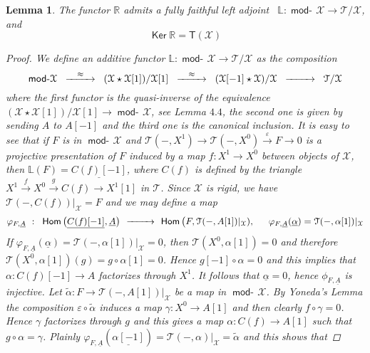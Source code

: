 \documentclass[oneside, a4paper,reqno]{amsart}
\numberwithin{equation}{section}
\newtheorem{lem}[thm]{Lemma}
\theoremstyle{definition}
\begin{document}
\begin{lem} The functor $\mathbb R$ admits a fully faithful left adjoint  \ $\mathbb L \colon \operatorname*{\mathsf{mod}-\!}{\mathcal X} {\longrightarrow} {\mathcal T}/{\mathcal X}$,  and \[\operatorname*{\mathsf{Ker}}\mathbb R = \mathsf{T}({\mathcal X})\]
\begin{proof} We define an additive functor $\mathbb{L} \colon \operatorname*{\mathsf{mod}-\!}{\mathcal X} {\longrightarrow} {\mathcal T}/{\mathcal X}$ as the composition
\[
\begin{CD}
\operatorname*{\mathsf{mod}-\!}{\mathcal X}  \ @> \approx >>  \  ({\mathcal X}\star{\mathcal X}[1])/{\mathcal X}[1] \  @> \approx >> \ ({\mathcal X}[-1]\star{\mathcal X})/{\mathcal X} \ @> >>  \ {\mathcal T}/{\mathcal X}
\end{CD}
\]   
where the first functor is the quasi-inverse of the equivalence $({\mathcal X}\star{\mathcal X}[1])/{\mathcal X}[1] {\longrightarrow} \operatorname*{\mathsf{mod}-\!}{\mathcal X}$, see Lemma $4.4$, the second one is given by sending $A$ to $A[-1]$ and the third one is the canonical inclusion. It is easy to see that if $F$ is in $\operatorname*{\mathsf{mod}-\!}{\mathcal X}$ and ${\mathcal T}(-,X^{1}) {\longrightarrow} {\mathcal T}(-,X^{0}) \stackrel{\varepsilon}{\longrightarrow} F {\longrightarrow} 0$ is a projective presentation of $F$ induced by a map $f \colon X^{1} {\longrightarrow} X^{0}$ between objects of ${\mathcal X}$, then $\mathbb{L}(F) = \underline{C(f)[-1]}$, where $C(f)$ is defined by the triangle $X^{1} \stackrel{f}{\longrightarrow} X^{0} \stackrel{g}{\longrightarrow} C(f) {\longrightarrow} X^{1}[1]$ in ${\mathcal T}$. Since ${\mathcal X}$ is rigid, we have ${\mathcal T}(-,C(f))|_{\mathcal X} = F$ and we may define a map  
\[
\begin{CD}
\varphi_{F,{\underline A}} \,\ \colon \,\,  \operatorname{\mathsf{Hom}}\big(\underline{C(f)[-1]},{\underline A}\big) \, @> >> \, \operatorname{\mathsf{Hom}}\big( F,\mathbb {\mathcal T}(-,A[1])|_{\mathcal X}), \,\,\,\ \ \ \varphi_{F,{\underline A}}(\underline{\alpha}) = {\mathcal T}(-,\alpha[1])|_{\mathcal X}
\end{CD}
\] 
If $\varphi_{F,{\underline A}}(\underline{\alpha}) = {\mathcal T}(-,\alpha[1])|_{\mathcal X} = 0$, then ${\mathcal T}(X^{0},\alpha[1]) = 0$ and therefore ${\mathcal T}(X^{0},\alpha[1])(g) = g \circ \alpha[1] = 0$. Hence $g[-1] \circ \alpha = 0$ and this implies that $\alpha \colon C(f)[-1] {\longrightarrow} A$ factorizes through $X^{1}$. It follows that $\underline{\alpha} = 0$, hence $\phi_{F,{\underline A}}$ is injective. Let $\widetilde{\alpha} \colon   F {\longrightarrow} \mathbb {\mathcal T}(-,A[1])|_{\mathcal X}$ be a map in $\operatorname*{\mathsf{mod}-\!}{\mathcal X}$. By Yoneda's Lemma the composition $\varepsilon \circ \widetilde{\alpha}$ induces a map $\gamma \colon X^{0} {\longrightarrow} A[1]$ and then clearly $f \circ \gamma = 0$. Hence $\gamma$ factorizes through $g$ and this gives a map $\alpha \colon C(f) {\longrightarrow} A[1]$ such that $g \circ \alpha = \gamma$. Plainly $\varphi_{F,{\underline A}}(\underline{\alpha[-1]}) = {\mathcal T}(-,\alpha)|_{\mathcal X} = \widetilde{\alpha}$ and this shows that 

\end{proof}
\end{lem}
\end{document}
